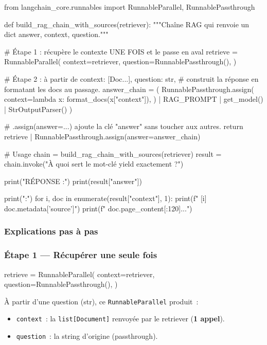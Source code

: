 \documentclass[11pt,a4paper]{article}
\begin{document}
\begin{pythoncode}
from langchain_core.runnables import RunnableParallel, RunnablePassthrough


def build_rag_chain_with_sources(retriever):
    """Chaîne RAG qui renvoie un dict {answer, context, question}."""

    # Étape 1 : récupère le contexte UNE FOIS et le passe en aval
    retrieve = RunnableParallel(
        context=retriever,
        question=RunnablePassthrough(),
    )

    # Étape 2 : à partir de {context: [Doc...], question: str},
    # construit la réponse en formatant les docs au passage.
    answer_chain = (
        RunnablePassthrough.assign(
            context=lambda x: format_docs(x["context"]),
        )
        | RAG_PROMPT
        | get_model()
        | StrOutputParser()
    )

    # .assign(answer=...) ajoute la clé "answer" sans toucher aux autres.
    return retrieve | RunnablePassthrough.assign(answer=answer_chain)


# Usage
chain  = build_rag_chain_with_sources(retriever)
result = chain.invoke("À quoi sert le mot-clé yield exactement ?")

print("RÉPONSE :")
print(result["answer"])

print("\nSOURCES :")
for i, doc in enumerate(result["context"], 1):
    print(f"  [{i}] {doc.metadata['source']}")
    print(f"      {doc.page_content[:120]}...")
\end{pythoncode}

\subsubsection{Explications pas à pas}

\subsubsection*{Étape 1 — Récupérer une seule fois}

\begin{pythoncode}
retrieve = RunnableParallel(
    context=retriever,
    question=RunnablePassthrough(),
)
\end{pythoncode}

À partir d'une question (str), ce \texttt{RunnableParallel} produit~:
\begin{itemize}[leftmargin=*]
  \item \texttt{context}~: la \texttt{list[Document]} renvoyée par le
        retriever (\textbf{1 appel}).
  \item \texttt{question}~: la string d'origine (passthrough).
\end{itemize}
\end{document}
